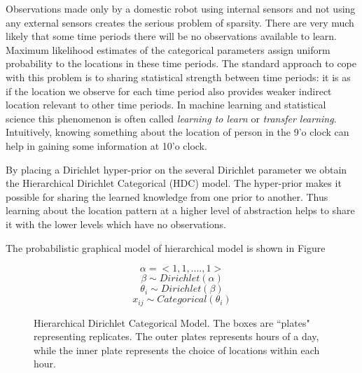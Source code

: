Observations made only by a domestic robot using internal sensors and not using any external sensors creates the serious problem of sparsity. There are very much likely that some time periods there will be no observations available to learn. Maximum likelihood estimates of the categorical parameters assign uniform probability to the locations in these time periods. The standard approach to cope with this problem is to sharing statistical strength between time periods: it is as if the location we observe for each time period also provides weaker indirect location relevant to other time periods. In machine learning and statistical science this phenomenon is often called \emph{learning to learn} or \emph{transfer learning}. Intuitively, knowing something about the location of person in the 9'o clock can help in gaining some information at 10'o clock. 

By placing a Dirichlet hyper-prior on the several Dirichlet parameter we obtain the  Hierarchical Dirichlet Categorical (HDC) model. The hyper-prior makes it possible for sharing the learned knowledge from one prior to another. Thus learning about the location pattern at a higher level of abstraction helps to share it with the lower levels which have no observations.

The probabilistic graphical model of  hierarchical model is shown in Figure \cite{hdcm}

\noindent
\begin{figure}[htp]

\begin{minipage}{0.3\textwidth}
\centering


\end{minipage}%
\begin{minipage}{0.7\textwidth}

\begin{equation*}
	\alpha = <1, 1, .... , 1 > 
\end{equation*}
\begin{equation*}
	\beta \sim Dirichlet(\alpha)
\end{equation*}
\begin{equation*}
	\theta_i  \sim Dirichlet(\beta)
\end{equation*}
\begin{equation*}
	x_{ij} \sim Categorical(\theta_i)
\end{equation*}
\end{minipage}
\caption[Hierarchical dirichlet categorical graphical model representation]{Hierarchical Dirichlet Categorical Model. The boxes are ``plates" representing replicates. The outer plates represents hours of a day, while the inner plate represents the choice of locations within each hour.}
\label{hdcm}
\end{figure}

